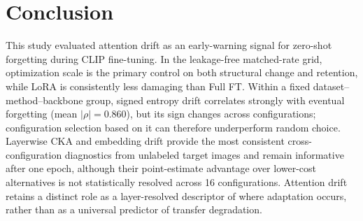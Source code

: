 \documentclass[conference]{IEEEtran}
\begin{document}
\section{Conclusion}
This study evaluated attention drift as an early-warning signal for zero-shot forgetting during CLIP fine-tuning. In the leakage-free matched-rate grid, optimization scale is the primary control on both structural change and retention, while LoRA is consistently less damaging than Full FT. Within a fixed dataset--method--backbone group, signed entropy drift correlates strongly with eventual forgetting (mean $|\rho|=0.860$), but its sign changes across configurations; configuration selection based on it can therefore underperform random choice. Layerwise CKA and embedding drift provide the most consistent cross-configuration diagnostics from unlabeled target images and remain informative after one epoch, although their point-estimate advantage over lower-cost alternatives is not statistically resolved across 16 configurations. Attention drift retains a distinct role as a layer-resolved descriptor of where adaptation occurs, rather than as a universal predictor of transfer degradation.

\FloatBarrier


\end{document}
